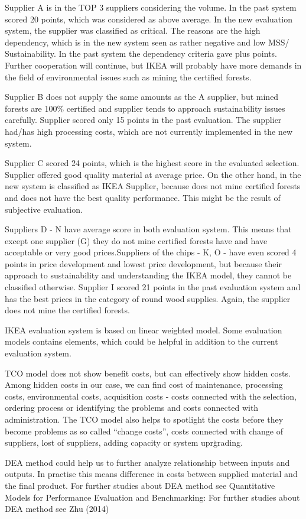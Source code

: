 \documentclass[oneside,12pt]{article}%
\begin{document}
\newline
Supplier A is in the TOP 3 suppliers considering the volume. In the past system scored 20 points, which was considered as above average. In the new evaluation system, the supplier was classified as critical. The reasons are the high dependency, which is in the new system seen as rather negative and low MSS/ Sustainability. In the past system the dependency criteria  gave plus points. Further cooperation will continue, but IKEA will probably have more demands in the field of environmental issues such as mining the certified forests. \par
Supplier B does not supply the same amounts as the A supplier, but mined forests are 100\% certified and supplier tends to approach sustainability issues carefully. Supplier scored only 15 points in the past evaluation. The supplier had/has high processing costs, which are not currently implemented in the new system. \par
Supplier C scored 24 points, which is the highest score in the evaluated selection. Supplier offered good quality material at average price. On the other hand, in the new system is classified as IKEA Supplier, because does not mine certified forests and does not have the best quality performance. This might be the result of subjective evaluation.\par
Suppliers D - N have average score in both evaluation system. This means that except one supplier (G) they do not mine certified forests have and have acceptable or very good prices.Suppliers of the chips - K, O -  have even scored 4 points in price development and lowest price development, but because their approach to sustainability and understanding the IKEA model, they cannot be classified otherwise. Supplier I scored 21 points in the past evaluation system and has the best prices in the category of round wood supplies. Again, the supplier does not mine the certified forests.



IKEA evaluation system is based on linear weighted model. Some evaluation models contains elements, which could be helpful in addition to the current evaluation system. \par
TCO model does not show benefit costs, but can effectively show hidden costs. Among hidden costs in our case, we can find cost of maintenance, processing costs, environmental costs, acquisition costs - costs connected with the selection, ordering process or identifying the problems and costs connected with administration. The TCO model also helps to spotlight the costs before they become problems as so called  “change costs”, costs connected with change of suppliers, lost of suppliers, adding capacity or system uprģrading. \par
DEA method could help us to further analyze relationship between inputs and outputs. In practise this means difference in costs between supplied material and the final product. For further studies about DEA method see Quantitative Models for Performance Evaluation and Benchmarking: For further studies about DEA method see Zhu (2014)
\end{document}
